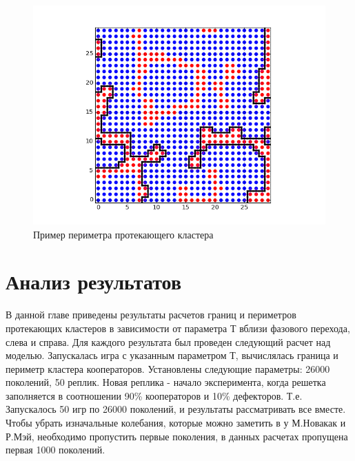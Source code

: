\documentclass[14pt]{article}
\begin{document}
\begin{figure}
	\includegraphics[center]{border.png}
	\caption{Пример периметра протекающего кластера}
	\label{fig:perim}
\end{figure}
\section{Анализ результатов}
\par В данной главе приведены результаты расчетов границ и периметров протекающих кластеров в зависимости от параметра Т вблизи фазового перехода, слева и справа. Для каждого результата был проведен следующий расчет над моделью. Запускалась игра с указанным параметром Т, вычислялась граница и периметр кластера кооператоров. Установлены следующие параметры: 26000 поколений, 50 реплик. Новая реплика - начало эксперимента, когда решетка заполняется в соотношении 90\% кооператоров и 10\% дефекторов. Т.е. Запускалось 50 игр по 26000 поколений, и результаты рассматривать все вместе. Чтобы убрать изначальные колебания, которые можно заметить в у М.Новакак и Р.Мэй, необходимо пропустить первые поколения, в данных расчетах пропущена первая 1000 поколений.
\\
\end{document}
